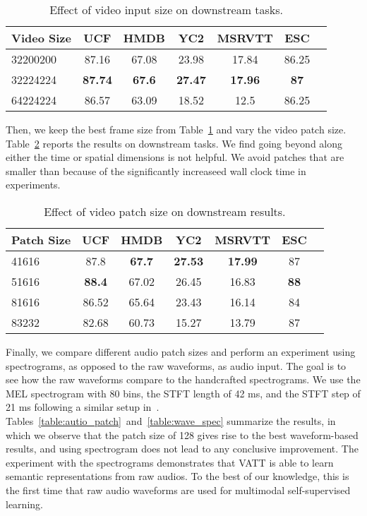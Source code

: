 \documentclass[10pt,twocolumn,letterpaper]{article}
\newcommand{\ours}{VATT\xspace}
\begin{document}
\begin{table}[h!]
    \small
    \centering
    \setlength{\tabcolsep}{3pt}
    \begin{tabular}{@{}lcccccc@{}}
    \toprule
    Video Size & UCF & HMDB & YC2 & MSRVTT & ESC \\
    \midrule
    32200200 & 87.16 & 67.08 & 23.98 & 17.84 & 86.25 \\
    32224224 & \textbf{87.74} & \textbf{67.6} & \textbf{27.47} & \textbf{17.96} & \textbf{87} \\
    64224224 & 86.57 & 63.09 & 18.52 & 12.5 & 86.25 \\
    \bottomrule
    \end{tabular}
    \vspace{2mm}
    \caption{Effect of video input size on downstream tasks.}
    \label{table:frame_patch}
    \vspace{-2mm}
\end{table} 
Then, we keep the best frame size from Table~\ref{table:frame_patch} and vary the video patch size. Table~\ref{table:video_patch} reports the results on downstream tasks. We find going beyond  along either the time or spatial dimensions is not helpful. We avoid patches that are smaller than  because of the significantly increaseed wall clock time in experiments.
\begin{table}[h!]
    \small
    \centering
    \setlength{\tabcolsep}{3pt}
    \begin{tabular}{@{}lcccccc@{}}
    \toprule
    Patch Size & UCF & HMDB & YC2 & MSRVTT & ESC \\
    \midrule
    41616 & 87.8 & \textbf{67.7} & \textbf{27.53} & \textbf{17.99} & 87 \\
    51616 & \textbf{88.4} & 67.02 & 26.45 & 16.83 & \textbf{88} \\
    81616 & 86.52 & 65.64 & 23.43 & 16.14 & 84 \\
    83232 & 82.68 & 60.73 & 15.27 & 13.79 & 87 \\
    \bottomrule
    \end{tabular}
    \vspace{2mm}
    \caption{Effect of video patch size on downstream results.}
    \label{table:video_patch}
    \vspace{-2mm}
\end{table} 
Finally, we compare different audio patch sizes and perform an experiment using spectrograms, as opposed to the raw waveforms, as audio input. The goal is to see how the raw waveforms compare to the handcrafted spectrograms. We use the MEL spectrogram with 80 bins, the STFT length of 42 ms, and the STFT step of 21 ms following a similar setup in~\cite{mmv}. Tables~\ref{table:autio_patch}~and~\ref{table:wave_spec} summarize the results, in which we observe that the patch size of 128 gives rise to the best waveform-based results, and using spectrogram does not lead to any conclusive improvement. The experiment with the spectrograms demonstrates that \ours is able to learn semantic representations from raw audios. To the best of our knowledge, this is the first time that raw audio waveforms are used for multimodal self-supervised learning.
\end{document}
